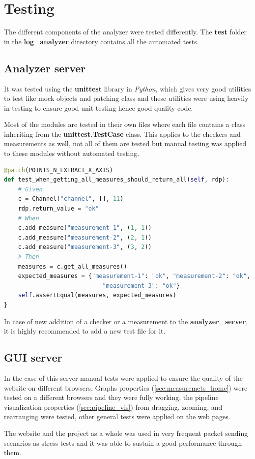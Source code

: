 \section{Testing}
The different components of the analyzer were tested differently. The \textbf{test} folder in the
\textbf{log\_analyzer} directory contains all the automated tests.

\subsection{Analyzer server}
It was tested using the \textbf{unittest} library  in \textit{Python}, which gives very good
utilities to test like mock objects and patching class and these utilities were using heavily
in testing to ensure good unit testing hence good quality code.

Most of the modules are tested in their own files where each file contains a class inheriting
from the \textbf{unittest.TestCase} class. This applies to the checkers and measurements as well,
not all of them are tested but manual testing was applied to these modules without automated testing.
\newline
\begin{lstlisting}[language=python, caption={Example of the automated tests},captionpos=b]
@patch(POINTS_N_EXTRACT_X_AXIS)
def test_when_getting_all_measures_should_return_all(self, rdp):
	# Given
	c = Channel("channel", [], 11)
	rdp.return_value = "ok"
	# When
	c.add_measure("measurement-1", (1, 1))
	c.add_measure("measurement-2", (2, 1))
	c.add_measure("measurement-3", (3, 2))
	# Then
	measures = c.get_all_measures()
	expected_measures = {"measurement-1": "ok", "measurement-2": "ok",
							"measurement-3": "ok"}
	self.assertEqual(measures, expected_measures)
}
\end{lstlisting}

In case of new addition of a checker or a measurement to the \textbf{analyzer\_server}, it is
highly recommended to add a new test file for it.

\subsection{GUI server}
In the case of this server manual tests were applied to ensure the quality of the website on 
different browsers. Graphs properties (\ref{sec:measuremets_home}) were tested on a different browsers
and they were fully working, the pipeline visualization properties (\ref{sec:pipeline_vis}) from dragging, 
zooming, and rearranging were tested, other general tests were applied on the web pages.

The website and the project as a whole was used in very frequent packet sending scenarios as
stress tests and it was able to sustain a good performance through them.